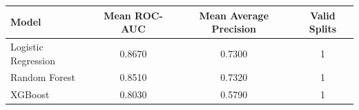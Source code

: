 \begin{tabular}{lccc}
\hline
Model & Mean ROC-AUC & Mean Average Precision & Valid Splits \\
\hline
Logistic Regression & 0.8670 & 0.7300 & 1 \\
Random Forest & 0.8510 & 0.7320 & 1 \\
XGBoost & 0.8030 & 0.5790 & 1 \\
\hline
\end{tabular}